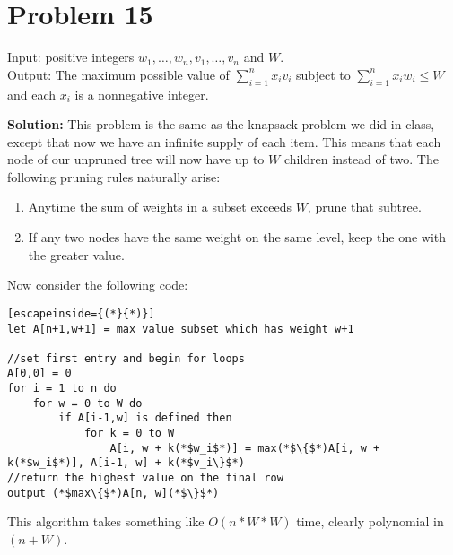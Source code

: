 \documentclass{article}
\providecommand{\prob}[1]{\section*{Problem #1}}
\providecommand{\soln}{\textbf{Solution: }}
\begin{document}
\prob{15}
Input: positive integers $w_1, \dots, w_n, v_1, \dots, v_n$ and $W$.\\
Output: The maximum possible value of $\sum_{i=1}^n x_i v_i$ subject to $\sum_{i=1}^n x_i w_i \leq W$ and each $x_i$ is a nonnegative integer.
\par \medskip

\soln This problem is the same as the knapsack problem we did in class, except that now we have an infinite supply of each item. This means that each node of our unpruned tree will now have up to $W$ children instead of two. The following pruning rules naturally arise:
\begin{enumerate}
    \item Anytime the sum of weights in a subset exceeds $W$, prune that subtree.
    \item If any two nodes have the same weight on the same level, keep the one with the greater value.
\end{enumerate}
Now consider the following code:\par
\begin{lstlisting}[escapeinside={(*}{*)}]
let A[n+1,w+1] = max value subset which has weight w+1

//set first entry and begin for loops
A[0,0] = 0
for i = 1 to n do
    for w = 0 to W do
        if A[i-1,w] is defined then
            for k = 0 to W
                A[i, w + k(*$w_i$*)] = max(*$\{$*)A[i, w + k(*$w_i$*)], A[i-1, w] + k(*$v_i\}$*)
//return the highest value on the final row
output (*$max\{$*)A[n, w](*$\}$*)
\end{lstlisting}
This algorithm takes something like $O(n*W*W)$ time, clearly polynomial in $\left(n+W\right)$.
\end{document}
